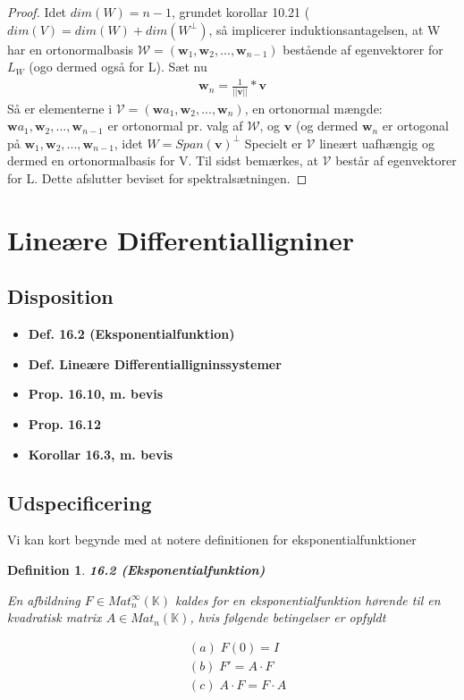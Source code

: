 \documentclass[paper=a4, fontsize=11pt]{scrartcl} %
\newtheorem*{definition}{Definition}
\newenvironment{cstmdefinition}[1]{\begin{definition} {\normalfont\textbf{#1}}}{\end{definition}}
\begin{document}
\begin{proof}
		Idet $dim(W)=n-1$, grundet korollar 10.21 ($dim(V)=dim(W)+dim(W^\bot)$, så implicerer induktionsantagelsen, at W har en ortonormalbasis $\mathcal{W}=(\mathbf{w}_1,\mathbf{w}_2,...,\mathbf{w}_{n-1})$ bestående af egenvektorer for $L_W$ (ogo dermed også for L). Sæt nu
		\begin{align*}
			\mathbf{w}_n=\frac{1}{||\mathbf{v}||}*\mathbf{v}
		\end{align*}
		Så er elementerne i $\mathcal{V}=(\mathbf{w}a_1,\mathbf{w}_2,...,\mathbf{w}_n)$, en ortonormal mængde: $\mathbf{w}a_1,\mathbf{w}_2,...,\mathbf{w}_{n-1}$ er ortonormal pr. valg af $\mathcal{W}$, og $\mathbf{v}$ (og dermed $\mathbf{w}_n$ er ortogonal på $\mathbf{w}_1,\mathbf{w}_2,...,\mathbf{w}_{n-1}$, idet $W=Span(\mathbf{v})^\bot$ Specielt er $\mathcal{V}$ lineært uafhængig og dermed en ortonormalbasis for V. Til sidst bemærkes, at $\mathcal{V}$ består af egenvektorer for L. Dette afslutter beviset for spektralsætningen. 
	\end{proof}
	
	\newpage
	
	\section{Lineære Differentialligniner}
	
	
	\subsection{Disposition}
	
	\begin{itemize}
		\item \textbf{Def. 16.2 (Eksponentialfunktion)}
		\item \textbf{Def. Lineære Differentialligninssystemer}
		\item \textbf{Prop. 16.10, m. bevis}
		\item \textbf{Prop. 16.12}
		\item \textbf{Korollar 16.3, m. bevis}
	\end{itemize}
	
	\subsection{Udspecificering}
	
	
	Vi kan kort begynde med at notere definitionen for eksponentialfunktioner
	
	\begin{cstmdefinition}{16.2 (Eksponentialfunktion)}
		
		En afbildning $F \in Mat_n^{\infty}(\mathbb{K})$ kaldes for en eksponentialfunktion hørende til en kvadratisk matrix $A \in Mat_n(\mathbb{K})$, hvis følgende betingelser er opfyldt
		
		\begin{align*}
			&(a) \; F(0) = I\\
			&(b) \; F' = A \cdot F \\
			&(c) \; A \cdot F = F \cdot A
		\end{align*}
		
	\end{cstmdefinition}
	
\end{document}
